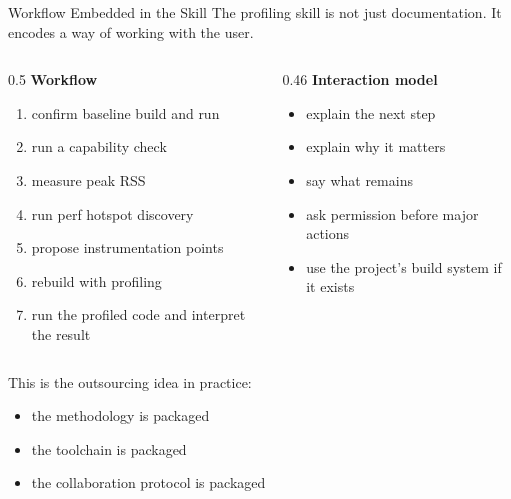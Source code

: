 \documentclass[aspectratio=169]{beamer}
\begin{document}
\begin{frame}{Workflow Embedded in the Skill}
  The profiling skill is not just documentation. It encodes a way of working
  with the user.

  \vspace{0.5em}
  \begin{columns}[T,totalwidth=\textwidth]
    \begin{column}{0.5\textwidth}
      \textbf{Workflow}
      \begin{enumerate}
        \item confirm baseline build and run
        \item run a capability check
        \item measure peak RSS
        \item run perf hotspot discovery
        \item propose instrumentation points
        \item rebuild with profiling
        \item run the profiled code and interpret the result
      \end{enumerate}
    \end{column}
    \begin{column}{0.46\textwidth}
      \textbf{Interaction model}
      \begin{itemize}
        \item explain the next step
        \item explain why it matters
        \item say what remains
        \item ask permission before major actions
        \item use the project's build system if it exists
      \end{itemize}
    \end{column}
  \end{columns}

  \vspace{0.5em}
  This is the outsourcing idea in practice:
  \begin{itemize}
    \item the methodology is packaged
    \item the toolchain is packaged
    \item the collaboration protocol is packaged
  \end{itemize}
\end{frame}
\end{document}
